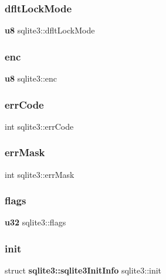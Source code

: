 \mbox{\label{structsqlite3_af21b4bbd0d1cda779f2b9e8262e5deec}} 
\subsubsection{dfltLockMode}
{\footnotesize\ttfamily \textbf{ u8} sqlite3\+::dflt\+Lock\+Mode}

\mbox{\label{structsqlite3_abad75b8b6663c237060656d1ae715e45}} 
\subsubsection{enc}
{\footnotesize\ttfamily \textbf{ u8} sqlite3\+::enc}

\mbox{\label{structsqlite3_a73adbb5395118bcbd9e4d705712966a2}} 
\subsubsection{errCode}
{\footnotesize\ttfamily int sqlite3\+::err\+Code}

\mbox{\label{structsqlite3_a12541dafcf60cfce52fb60f84e42f152}} 
\subsubsection{errMask}
{\footnotesize\ttfamily int sqlite3\+::err\+Mask}

\mbox{\label{structsqlite3_aebc463830dbf480c7ed00e1f401c6a70}} 
\subsubsection{flags}
{\footnotesize\ttfamily \textbf{ u32} sqlite3\+::flags}

\mbox{\label{structsqlite3_a14bb7fbfa6b662021069fcdf6b334d70}} 
\subsubsection{init}
{\footnotesize\ttfamily struct \textbf{ sqlite3\+::sqlite3\+Init\+Info}  sqlite3\+::init}

